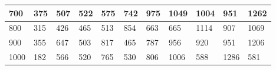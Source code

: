 \documentclass[10pt,letterpaper]{article}
\begin{document}
\begin{center}
\begin{table}
\begin{tabular} { |m{0.5cm}|m{1.3cm}|m{1.3cm}|m{1.3cm}|m{1.3cm}|m{1.3cm}|m{1.3cm}|m{1.3cm}|m{1.3cm}|m{1.3cm}|m{1.3cm}|}
\hline
\cellcolor{Gray}700 & \Large 375 & \Large 507 & \Large 522 & \Large 575 & \Large 742 & \Large 975 & \Large 1049 & \Large 1004 & \Large 951 & \Large 1262 \\
\hline
\cellcolor{Gray}800 & \Large 315 & \Large 426 & \Large 465 & \Large 513 & \Large 854 & \Large 663 & \Large 665 & \Large 1114 & \Large 907 & \Large 1069 \\
\hline
\cellcolor{Gray}900 & \Large 355 & \Large 647 & \Large 503 & \Large 817 & \Large 465 & \Large 787 & \Large 956 & \Large 920 & \Large 951 & \Large 1206 \\
\hline
\cellcolor{Gray}1000 & \Large 182 & \Large 566 & \Large 520 & \Large 765 & \Large 530 & \Large 806 & \Large 1006 & \Large 588 & \Large 1286 & \Large 581 \\
\hline
\end{tabular} \\
\end{table}
\end{center}
\newpage 
{}
\end{document}
